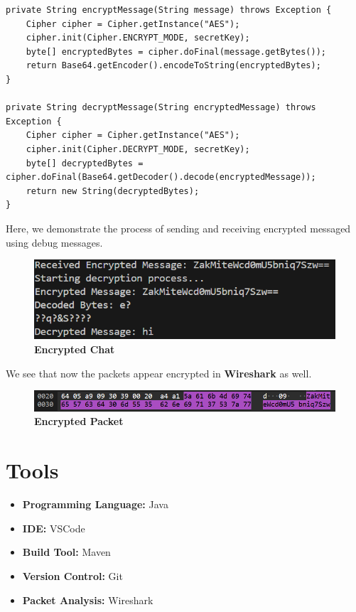 \documentclass[a4paper,12pt]{article}
\begin{document}
\begin{lstlisting}[caption={\textbf{Encryption and Decryption}}, label={lst:encryption}]
private String encryptMessage(String message) throws Exception {
    Cipher cipher = Cipher.getInstance("AES");
    cipher.init(Cipher.ENCRYPT_MODE, secretKey);
    byte[] encryptedBytes = cipher.doFinal(message.getBytes());
    return Base64.getEncoder().encodeToString(encryptedBytes);
}

private String decryptMessage(String encryptedMessage) throws Exception {
    Cipher cipher = Cipher.getInstance("AES");
    cipher.init(Cipher.DECRYPT_MODE, secretKey);
    byte[] decryptedBytes = cipher.doFinal(Base64.getDecoder().decode(encryptedMessage));
    return new String(decryptedBytes);
}
\end{lstlisting}

Here, we demonstrate the process of sending and receiving encrypted messaged using debug messages.
\begin{figure}[H]
    \centering
    \includegraphics[width=1\linewidth]{assets/Terminal Encrypted.png}
    \caption{\textbf{Encrypted Chat}}
    \label{fig:enter-label}
\end{figure}

We see that now the packets appear encrypted in \textbf{Wireshark} as well.
\begin{figure}[H]
    \centering
    \includegraphics[width=1\linewidth]{assets/Encrypted Message.png}
    \caption{\textbf{Encrypted Packet}}
    \label{fig:encrypted-message}
\end{figure}

\section{Tools}
\begin{itemize}
    \item \textbf{Programming Language:} Java
    \item \textbf{IDE:} VSCode
    \item \textbf{Build Tool:} Maven
    \item \textbf{Version Control:} Git
    \item \textbf{Packet Analysis:} Wireshark
\end{itemize}
\end{document}
